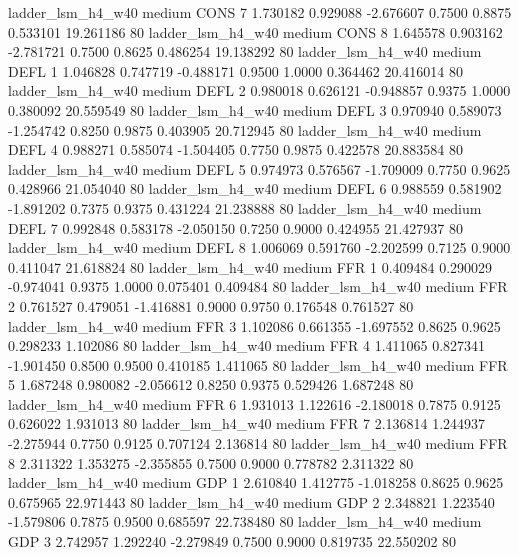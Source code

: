      ladder_lsm_h4_w40     medium     CONS                 7  1.730182 0.929088 -2.676607 0.7500 0.8875  0.533101   19.261186 80
     ladder_lsm_h4_w40     medium     CONS                 8  1.645578 0.903162 -2.781721 0.7500 0.8625  0.486254   19.138292 80
     ladder_lsm_h4_w40     medium     DEFL                 1  1.046828 0.747719 -0.488171 0.9500 1.0000  0.364462   20.416014 80
     ladder_lsm_h4_w40     medium     DEFL                 2  0.980018 0.626121 -0.948857 0.9375 1.0000  0.380092   20.559549 80
     ladder_lsm_h4_w40     medium     DEFL                 3  0.970940 0.589073 -1.254742 0.8250 0.9875  0.403905   20.712945 80
     ladder_lsm_h4_w40     medium     DEFL                 4  0.988271 0.585074 -1.504405 0.7750 0.9875  0.422578   20.883584 80
     ladder_lsm_h4_w40     medium     DEFL                 5  0.974973 0.576567 -1.709009 0.7750 0.9625  0.428966   21.054040 80
     ladder_lsm_h4_w40     medium     DEFL                 6  0.988559 0.581902 -1.891202 0.7375 0.9375  0.431224   21.238888 80
     ladder_lsm_h4_w40     medium     DEFL                 7  0.992848 0.583178 -2.050150 0.7250 0.9000  0.424955   21.427937 80
     ladder_lsm_h4_w40     medium     DEFL                 8  1.006069 0.591760 -2.202599 0.7125 0.9000  0.411047   21.618824 80
     ladder_lsm_h4_w40     medium      FFR                 1  0.409484 0.290029 -0.974041 0.9375 1.0000  0.075401    0.409484 80
     ladder_lsm_h4_w40     medium      FFR                 2  0.761527 0.479051 -1.416881 0.9000 0.9750  0.176548    0.761527 80
     ladder_lsm_h4_w40     medium      FFR                 3  1.102086 0.661355 -1.697552 0.8625 0.9625  0.298233    1.102086 80
     ladder_lsm_h4_w40     medium      FFR                 4  1.411065 0.827341 -1.901450 0.8500 0.9500  0.410185    1.411065 80
     ladder_lsm_h4_w40     medium      FFR                 5  1.687248 0.980082 -2.056612 0.8250 0.9375  0.529426    1.687248 80
     ladder_lsm_h4_w40     medium      FFR                 6  1.931013 1.122616 -2.180018 0.7875 0.9125  0.626022    1.931013 80
     ladder_lsm_h4_w40     medium      FFR                 7  2.136814 1.244937 -2.275944 0.7750 0.9125  0.707124    2.136814 80
     ladder_lsm_h4_w40     medium      FFR                 8  2.311322 1.353275 -2.355855 0.7500 0.9000  0.778782    2.311322 80
     ladder_lsm_h4_w40     medium      GDP                 1  2.610840 1.412775 -1.018258 0.8625 0.9625  0.675965   22.971443 80
     ladder_lsm_h4_w40     medium      GDP                 2  2.348821 1.223540 -1.579806 0.7875 0.9500  0.685597   22.738480 80
     ladder_lsm_h4_w40     medium      GDP                 3  2.742957 1.292240 -2.279849 0.7500 0.9000  0.819735   22.550202 80
